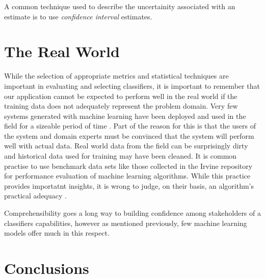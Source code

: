 \documentclass[12pt]{unbthesis}
\begin{document}
A common technique used to describe the uncertainity associated with
an estimate is to use \textit{confidence interval} estimates.


\section{The Real World}
While the selection of appropriate metrics and statistical techniques
are important in evaluating and selecting classifiers, it is important
to remember that our application cannot be expected to perform well in
the real world if the training data does not adequately represent the
problem domain. Very few systems generated with machine learning have
been deployed and used in the field for a sizeable period of time
\cite{RefWorks:46}. Part of the reason for this is that the users of
the system and domain experts must be convinced that the system will
perform well with actual data. Real world data from the field can be
surprisingly dirty \cite{RefWorks:58} and historical data used for
training may have been cleaned. It is common practise to use benchmark
data sets like those collected in the Irvine repository
\cite{RefWorks:59} for performance evaluation of machine learning
algorithms. While this practice provides importatnt insights, it is
wrong to judge, on their basis, an algorithm's practical adequacy
\cite{RefWorks:46}.

Comprehensibility goes a long way to building confidence among
stakeholders of a classifiers capabilities, however as mentioned
previously, few machine learning models offer much in this respect.

\section{Conclusions}


\renewcommand{\bibname}{References}



\end{document}
